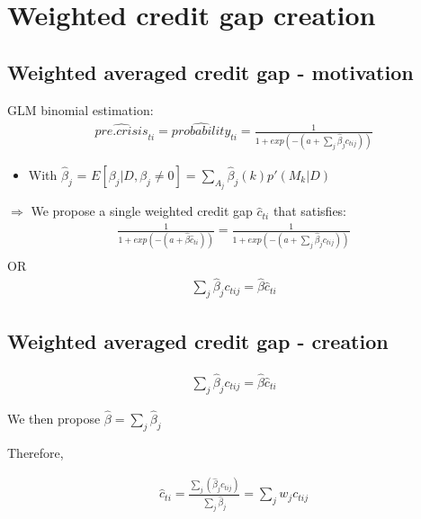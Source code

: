 \documentclass[
  12pt,
]{article}
\providecommand{\tightlist}{%
  \setlength{\itemsep}{0pt}\setlength{\parskip}{0pt}}
\begin{document}
\hypertarget{weighted-credit-gap-creation}{%
\section{Weighted credit gap creation}\label{weighted-credit-gap-creation}}

\hypertarget{weighted-averaged-credit-gap---motivation}{%
\subsection{Weighted averaged credit gap - motivation}\label{weighted-averaged-credit-gap---motivation}}

GLM binomial estimation:
\begin{align*}
\widehat{pre.crisis}_{ti} = \widehat{probability}_{ti} = \frac {1}{1+exp(-(a+\sum\nolimits_j \hat{\beta}_j c_{tij}))}
\end{align*}

\begin{itemize}
\tightlist
\item
  With \(\hat{\beta}_j\) = \(E[\beta_j|D, \beta_j\ne 0] = \sum\limits_{A_j} \hat{\beta}_j(k)p'(M_k|D)\)
\end{itemize}

\(\Rightarrow\) We propose a single weighted credit gap \(\hat{c}_{ti}\) that satisfies:
\begin{align*}
\frac {1}{1+exp(-(a+\hat{\beta} \hat{c}_{ti}))}= \frac {1}{1+exp(-(a+\sum\nolimits_j \hat{\beta}_j c_{tij}))} \\
\end{align*}
OR
\begin{align}
\sum\limits_j \hat{\beta}_j c_{tij} = \hat{\beta} \hat{c}_{ti}
\end{align}

\hypertarget{weighted-averaged-credit-gap---creation}{%
\subsection{Weighted averaged credit gap - creation}\label{weighted-averaged-credit-gap---creation}}

\begin{align*}
\sum\limits_j \hat{\beta}_j c_{tij} = \hat{\beta} \hat{c}_{ti}
\end{align*}

We then propose \(\hat{\beta} = \sum\nolimits_j \hat{\beta}_j\)

Therefore,

\begin{align}
\hat{c}_{ti} = \frac{\sum\nolimits_j (\hat{\beta}_j c_{tij})}{\sum\nolimits_j\hat{\beta}_j} = \sum\nolimits_j w_j c_{tij}
\end{align}
\end{document}
